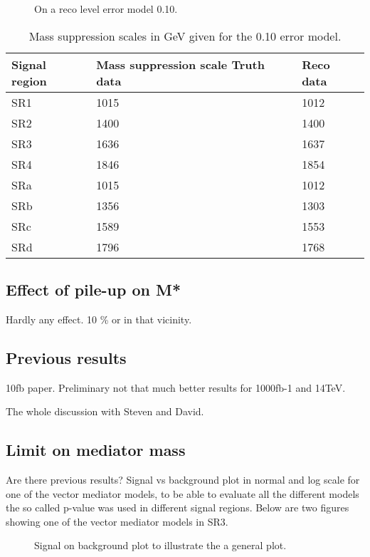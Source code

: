  \begin{figure}[H] %
    \hfill
    \caption{On a reco level error model 0.10.}
    \label{fig:SRnewM2r}
  \end{figure}

\begin{table}[ht]
\begin{center}
\begin{tabular}{|l|l|l|}
\hline
Signal region & Mass suppression scale Truth data & Reco data \\ \hline
SR1&1015&1012\\
SR2&1400&1400\\
SR3&1636&1637\\
SR4&1846&1854\\ \hline
SRa&1015&1012\\
SRb&1356&1303\\
SRc&1589&1553\\
SRd&1796&1768\\ \hline
\end{tabular}
\caption{Mass suppression scales in GeV given for the 0.10 error model.}
\label{tab:masssupp010}
\end{center}
\end{table}

\subsection{Effect of pile-up on M*}
Hardly any effect. 10 \% or in that vicinity.

\subsection{Previous results}
10fb paper.
Preliminary not that much better results for 1000fb-1 and 14TeV.

The whole discussion with Steven and David.


\subsection{Limit on mediator mass}
Are there previous results?
Signal vs background plot in normal and log scale for one of the vector mediator models, to be able to evaluate all the different models the so called p-value was used in different signal regions. Below are two figures showing one of the vector mediator models in SR3.
 \begin{figure}[H] %
    \hfill
    \caption{Signal on background plot to illustrate the a general plot. }
    \label{fig:sigback}
  \end{figure}

